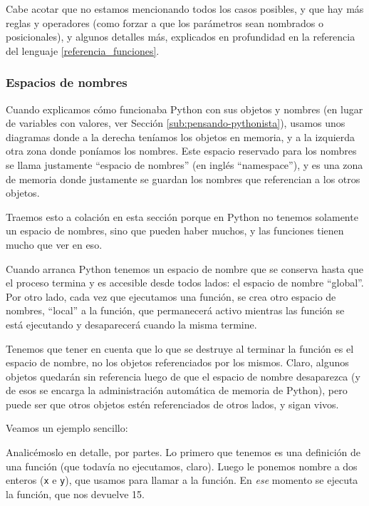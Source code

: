
Cabe acotar que no estamos mencionando todos los casos posibles, y que hay más reglas y operadores (como forzar a que los parámetros sean nombrados o posicionales), y algunos detalles más, explicados en profundidad en la referencia del lenguaje \ref{referencia_funciones}.


\subsubsection{Espacios de nombres}

Cuando explicamos cómo funcionaba Python con sus objetos y nombres (en lugar de variables con valores, ver Sección \ref{sub:pensando-pythonista}), usamos unos diagramas donde a la derecha teníamos los objetos en memoria, y a la izquierda otra zona donde poníamos los nombres. Este espacio reservado para los nombres se llama justamente ``espacio de nombres'' (en inglés ``namespace''), y es una zona de memoria donde justamente se guardan los nombres que referencian a los otros objetos.

Traemos esto a colación en esta sección porque en Python no tenemos solamente un espacio de nombres, sino que pueden haber muchos, y las funciones tienen mucho que ver en eso.

Cuando arranca Python tenemos un espacio de nombre que se conserva hasta que el proceso termina y es accesible desde todos lados: el espacio de nombre ``global''. Por otro lado, cada vez que ejecutamos una función, se crea otro espacio de nombres, ``local'' a la función, que permanecerá activo mientras las función se está ejecutando y desaparecerá cuando la misma termine.

Tenemos que tener en cuenta que lo que se destruye al terminar la función es el espacio de nombre, no los objetos referenciados por los mismos. Claro, algunos objetos quedarán sin referencia luego de que el espacio de nombre desaparezca (y de esos se encarga la administración automática de memoria de Python), pero puede ser que otros objetos estén referenciados de otros lados, y sigan vivos.

Veamos un ejemplo sencillo:


Analicémoslo en detalle, por partes. Lo primero que tenemos es una definición de una función (que todavía no ejecutamos, claro). Luego le ponemos nombre a dos enteros (\verb|x| e \verb|y|), que usamos para llamar a la función. En \textit{ese} momento se ejecuta la función, que nos devuelve 15.

